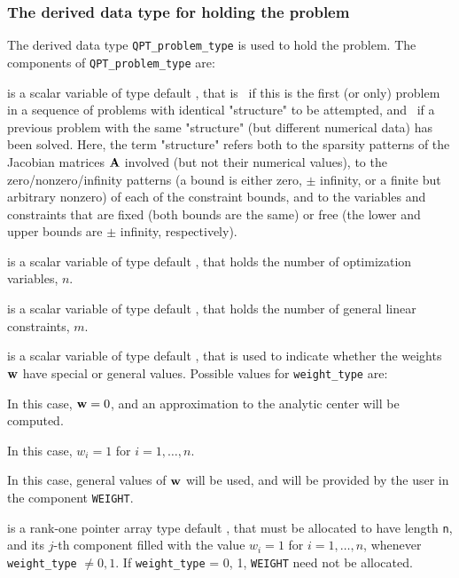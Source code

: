 \documentclass{galahad}
\begin{document}

\subsubsection{The derived data type for holding the problem}\label{typeprob}
The derived data type {\tt QPT\_problem\_type} is used to hold 
the problem. The components of 
{\tt QPT\_problem\_type} 
are:

\begin{description}

 is a scalar variable of type default \logical, 
 that is \true\ if this is the first (or only) problem in a sequence of 
 problems with identical "structure" to be attempted, and \false\ if 
 a previous problem with the same "structure" (but different
 numerical data) has been solved. Here, the term "structure" refers both to 
 the sparsity patterns of the Jacobian matrices ${\mathbf{A}}$ involved 
 (but not their numerical values), to the zero/nonzero/infinity patterns 
 (a bound is either zero, $\pm$ infinity, or a finite but arbitrary 
 nonzero) of each of the constraint bounds, and to the variables and constraints
 that are fixed (both bounds are the same) or free (the lower and upper
 bounds are $\pm$ infinity, respectively).

 is a scalar variable of type default \integer, 
 that holds the number of optimization variables, $n$.  
              
 is a scalar variable of type default \integer, 
 that holds the number of general linear constraints, $m$.
              
 is a scalar variable of type default \integer, 
that is used to indicate whether the weights ${\mathbf{w}}$ 
have special or general values. Possible values for {\tt weight\_type} are:
\begin{description}
  In this case, ${\mathbf{w}} = 0$, and an approximation to the 
  analytic center will be computed.

 In this case, $w_{i} = 1$ for $i = 1, \ldots ,n$.

 In this case, general values of ${\mathbf{w}}$ will be used,
     and will be provided by the user in the component {\tt WEIGHT}.
\end{description}

 is a rank-one pointer array type default \realdp, that 
must be allocated to have length {\tt n}, and its $j$-th component 
filled with the value $w_{i}  =  1$ for $i = 1, \ldots ,n$, 
whenever {\tt weight\_type} $\neq 0, 1$.
If {\tt weight\_type} {= 0, 1}, {\tt WEIGHT} need not be allocated.


\end{description}
\end{document}

